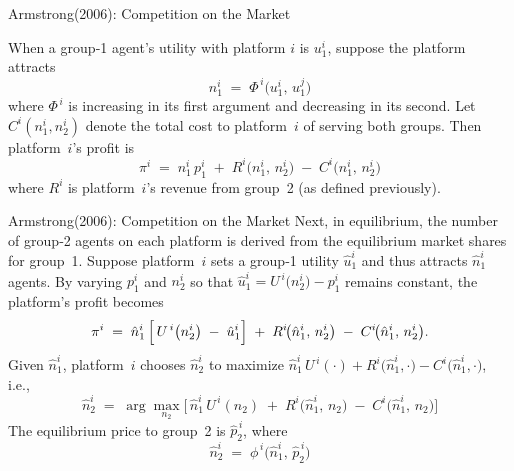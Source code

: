 \documentclass[aspectratio=169]{beamer}  %
\begin{document}
\begin{frame}{Armstrong(2006): Competition on the Market}
    \justifying  %

    When a group‐1 agent’s utility with platform \(i\) is \(u_{1}^{i}\), suppose the platform 
    attracts 
    \[
       n_{1}^{i} 
       \;=\; 
       \Phi^{\,i}\bigl(u_{1}^{i},\,u_{1}^{j}\bigr)
    \]
    where \(\Phi^{\,i}\) is increasing in its first argument and decreasing in its second.  
    Let \(C^{i}(n_{1}^{i},n_{2}^{i})\) denote the total cost to platform~\(i\) of serving both groups.  
    Then platform~\(i\)’s profit is
    \[
       \pi^{i}
       \;=\;
       n_{1}^{i}\,p_{1}^{i}
       \;+\;
       R^{i}\!\bigl(n_{1}^{i},\,n_{2}^{i}\bigr)
       \;-\;
       C^{i}\!\bigl(n_{1}^{i},\,n_{2}^{i}\bigr)
    \]
    where \(R^{i}\) is platform~\(i\)’s revenue from group~2 (as defined previously).
 
    
\end{frame}

\begin{frame}{Armstrong(2006): Competition on the Market}
    Next, in equilibrium, the number of group‐2 agents on each platform is derived from 
    the equilibrium market shares for group~1.  Suppose platform~\(i\) sets a group‐1 
    utility \(\hat{u}_{1}^{i}\) and thus attracts \(\hat{n}_{1}^{i}\) agents.  
    By varying \(p_{1}^{i}\) and \(n_{2}^{i}\) so that \(\hat{u}_{1}^{i} 
    = U^{\,i}\bigl(n_{2}^{i}\bigr) - p_{1}^{i}\) remains constant, the platform’s profit 
    becomes
    \[
       \pi^{i}
       \;=\;
       \hat{n}_{1}^{i}\,\Bigl[\,
         U^{\,i}\bigl(n_{2}^{i}\bigr)
         \;-\;
         \hat{u}_{1}^{i}
       \Bigr]
       \;+\;
       R^{i}\!\bigl(\hat{n}_{1}^{i},\,n_{2}^{i}\bigr)
       \;-\;
       C^{i}\!\bigl(\hat{n}_{1}^{i},\,n_{2}^{i}\bigr).
    \]
    Given \(\hat{n}_{1}^{i}\), platform~\(i\) chooses \(\hat{n}_{2}^{i}\) to maximize 
    \(\hat{n}_{1}^{i}\,U^{\,i}(\cdot) + R^{i}\bigl(\hat{n}_{1}^{i},\cdot\bigr) 
    - C^{i}\bigl(\hat{n}_{1}^{i},\cdot\bigr)\), i.e.,
    \[
       \hat{n}_{2}^{i}
       \;=\;
       \arg\max_{n_{2}}
       \bigl[\,
          \hat{n}_{1}^{i}\,U^{\,i}(n_{2})
          \;+\;
          R^{i}\!\bigl(\hat{n}_{1}^{i},\,n_{2}\bigr)
          \;-\;
          C^{i}\!\bigl(\hat{n}_{1}^{i},\,n_{2}\bigr)
       \bigr]
    \]
    The equilibrium price to group~2 is \(\hat{p}_{2}^{\,i}\), where
    \[
       \hat{n}_{2}^{i}
       \;=\;
       \phi^{\,i}
       \bigl(\hat{n}_{1}^{i},\,\hat{p}_{2}^{\,i}\bigr)
    \]
    
\end{frame}
\end{document}

